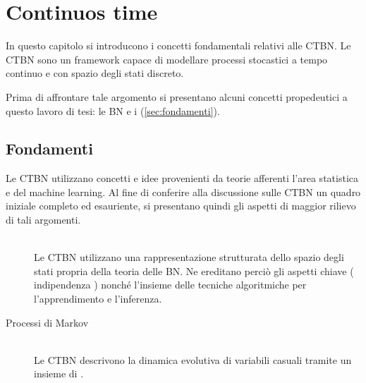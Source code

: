 
\chapter{Continuos time \bn{}}
\label{cap:ctbn}
\acresetall
In questo capitolo si introducono i concetti fondamentali relativi alle \ac{CTBN}. Le \acs{CTBN} sono un framework capace di modellare processi stocastici a tempo continuo e con spazio degli stati discreto.

Prima di affrontare tale argomento si presentano alcuni concetti propedeutici a questo lavoro di tesi: le \ac{BN} e i \mprocess{} (\autoref{sec:fondamenti}).
\section{Fondamenti}
\label{sec:fondamenti}
Le \acl{CTBN} utilizzano concetti e idee provenienti da teorie afferenti l'area statistica e del machine learning. Al fine di conferire alla discussione sulle \acs{CTBN} un quadro iniziale completo ed esauriente, si presentano quindi gli aspetti di maggior rilievo di tali argomenti.
\begin{description}
\item[\bn{}] \hfill \\
Le \acl{CTBN} utilizzano una rappresentazione strutturata dello spazio degli stati propria della teoria delle \acl{BN}. Ne ereditano perciò gli aspetti chiave (\eg{} indipendenza \cond*{}) nonché l'insieme delle tecniche algoritmiche per l'apprendimento e l'inferenza.
\item[Processi di Markov]\label{sec:fondamenti-mp}\hfill \\
Le \acl{CTBN} descrivono la dinamica evolutiva di variabili casuali tramite un insieme di \mprocess{} \cond{}.
\end{description}

